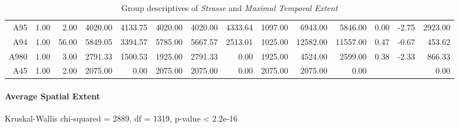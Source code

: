 \begin{table}[ht!]
\begin{tabular}{rrrrrrrrrrrrrr}
    A95  & 1.00 & 2.00 & 4020.00 & 4133.75 & 4020.00 & 4020.00 & 4333.64 & 1097.00 & 6943.00 & 5846.00 & 0.00 & -2.75 & 2923.00 \\ 
    A94  & 1.00 & 56.00 & 5849.05 & 3394.57 & 5785.00 & 5667.57 & 2513.01 & 1025.00 & 12582.00 & 11557.00 & 0.47 & -0.67 & 453.62 \\ 
    A980 & 1.00 & 3.00 & 2791.33 & 1500.53 & 1925.00 & 2791.33 & 0.00 & 1925.00 & 4524.00 & 2599.00 & 0.38 & -2.33 & 866.33 \\ 
    A45  & 1.00 & 2.00 & 2075.00 & 0.00 & 2075.00 & 2075.00 & 0.00 & 2075.00 & 2075.00 & 0.00 &  &  & 0.00 \\ 
    \hline
  \end{tabular}
	\caption{Group descriptives of \textit{Strasse} and \textit{Maximal Temporal Extent}}
	\label{tbl:descriptives_baysis_matched_Strasse_TMax}
\end{table}

\paragraph{Average Spatial Extent}
Kruskal-Wallis chi-squared = 2889, df = 1319, p-value < 2.2e-16

